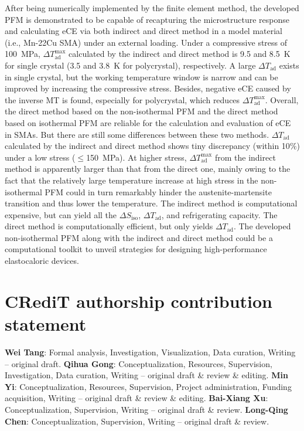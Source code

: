 \documentclass[reprint,3p,sort&compress,times,onecolumn]{elsarticle}
\begin{document}
After being numerically implemented by the finite element method, the developed PFM is demonstrated to be capable of recapturing the microstructure response and calculating eCE via both indirect and direct method in a model material (i.e., Mn-22Cu SMA) under an external loading. Under a compressive stress of 100~MPa, $\Delta T_{\text{ad}}^{\text{max}}$ calculated by the indirect and direct method is 9.5 and 8.5~K for single crystal (3.5 and 3.8~K for polycrystal), respectively. A large $\Delta T_{\text{ad}}$ exists in single crystal, but the working temperature window is narrow and can be improved by increasing the compressive stress. Besides, negative eCE caused by the inverse MT is found, especially for polycrystal, which reduces $\Delta T_{\text{ad}}^{\text{max}}$.
Overall, the direct method based on the non-isothermal PFM and the direct method based on isothermal PFM are reliable for the calculation and evaluation of eCE in SMAs. But there are still some differences between these two methods.
$\Delta T_{\text{ad}}$ calculated by the indirect and direct method shows tiny discrepancy (within 10$\%$) under a low stress ($\leq$150~MPa). 
At higher stress, $\Delta T_{\text{ad}}^{\text{max}}$ from the indirect method is apparently larger than that from the direct one, mainly owing to the fact that the relatively large temperature increase at high stress in the non-isothermal PFM could in turn remarkably hinder the austenite-martensite transition and thus lower the temperature.
The indirect method is computational expensive, but can yield all the $\Delta S_{\text{iso}}$, $\Delta T_{\text{ad}}$, and refrigerating capacity. The direct method is computationally efficient, but only yields $\Delta T_{\text{ad}}$. The developed non-isothermal PFM along with the indirect and direct method could be a computational toolkit to unveil strategies for designing high-performance elastocaloric devices.

\section*{CRediT authorship contribution statement}
\textbf{Wei Tang}: Formal analysis, Investigation, Visualization, Data curation, Writing -- original draft. \textbf{Qihua Gong}: Conceptualization, Resources, Supervision, Investigation, Data curation, Writing -- original draft \& review \& editing. \textbf{Min Yi}: Conceptualization, Resources, Supervision, Project administration, Funding acquisition, Writing -- original draft \& review \& editing. \textbf{Bai-Xiang Xu}: Conceptualization, Supervision, Writing -- original draft \& review.  \textbf{Long-Qing Chen}: Conceptualization, Supervision, Writing -- original draft \& review.
\end{document}

